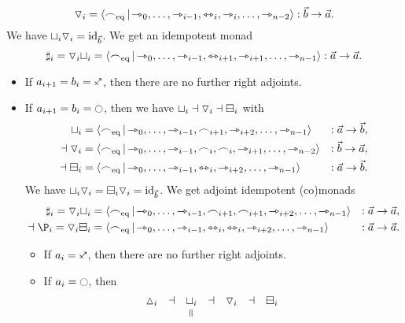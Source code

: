 \documentclass[a4paper]{memoir}
\begin{document}
\begin{example}
\begin{itemize}
		\[
			{\triangledown}_i = \mathopen{}\left\langle {\frown}_{{\mathrm{eq}}} \,\middle|\, {\rightarrowtriangle}_0, \ldots, {\rightarrowtriangle}_{i-1}, {\leftrightarrowtriangle}_{i}, {\rightarrowtriangle}_{i}, \ldots, {\rightarrowtriangle}_{n-2} \right\rangle\mathclose{} : \vec b \to \vec a.
		\]
		We have ${\sqcup}_i {\triangledown}_i = \mathrm{id}_{\vec b}$. We get an idempotent monad
		\[
			\sharp_i = {\triangledown}_i {\sqcup}_i = \mathopen{}\left\langle {\frown}_{{\mathrm{eq}}} \,\middle|\, {\rightarrowtriangle}_0, \ldots, {\rightarrowtriangle}_{i-1}, {\leftrightarrowtriangle}_{i+1}, {\rightarrowtriangle}_{i+1}, \ldots, {\rightarrowtriangle}_{n-1} \right\rangle\mathclose{} : \vec a \to \vec a.
		\]
		\begin{itemize}
			\item If $a_{i+1} = b_i = \ypolar$, then there are no further right adjoints.
			\item If $a_{i+1} = b_i = \npolar$, then we have ${\sqcup}_i \dashv {\triangledown}_i \dashv {\boxminus}_i$ with
			\begin{align*}
				{\sqcup}_i &= \mathopen{}\left\langle {\frown}_{{\mathrm{eq}}} \,\middle|\, {\rightarrowtriangle}_0, \ldots, {\rightarrowtriangle}_{i-1}, {\frown}_{i+1}, {\rightarrowtriangle}_{i+2}, \ldots, {\rightarrowtriangle}_{n-1} \right\rangle\mathclose{} &: \vec a \to \vec b, \\
				\dashv
				{\triangledown}_i &= \mathopen{}\left\langle {\frown}_{{\mathrm{eq}}} \,\middle|\, {\rightarrowtriangle}_0, \ldots, {\rightarrowtriangle}_{i-1}, {\frown}_{i}, {\frown}_{i}, {\rightarrowtriangle}_{i+1}, \ldots, {\rightarrowtriangle}_{n-2} \right\rangle\mathclose{} &: \vec b \to \vec a, \\
				\dashv
				{\boxminus}_i &= \mathopen{}\left\langle {\frown}_{{\mathrm{eq}}} \,\middle|\, {\rightarrowtriangle}_0, \ldots, {\rightarrowtriangle}_{i-1}, \leftrightarrowtriangle_i, {\rightarrowtriangle}_{i+2}, \ldots, {\rightarrowtriangle}_{n-1} \right\rangle\mathclose{} &: \vec a \to \vec b.
			\end{align*}
			We have ${\sqcup}_i {\triangledown}_i = {\boxminus}_i {\triangledown}_i = \mathrm{id}_{\vec b}$. We get adjoint idempotent (co)monads
			\begin{align*}
				\sharp_i = \cohcodisc_i \cohfget_i &= \reshlist{\eqtysym}{\jetsym_0, \ldots, \jetsym_{i-1}, \edgesym_{i+1}, \edgesym_{i+1}, \jetsym_{i+2}, \ldots, \jetsym_{n-1}} &: \vec a \to \vec a, \\
				\dashv
				\coshp_i = \cohcodisc_i \cohcopi_i &= \reshlist{\eqtysym}{\jetsym_0, \ldots, \jetsym_{i-1}, \equijet_{i}, \equijet_{i}, \jetsym_{i+2}, \ldots, \jetsym_{n-1}} &: \vec a \to \vec a.
			\end{align*}
			\begin{itemize}
				\item If $a_i = \ypolar$, then there are no further right adjoints.
				\item If $a_i = \npolar$, then
				\[
					\begin{array}{c c c c c c c c c}
						\cohdisc_i
						&\dashv&
						\cohfget_i
						&\dashv&
						\cohcodisc_i
						&\dashv&
						\cohcopi_i
						&&
						\\
						&&
						\rotatebox{90}{$=$}

\end{array}\]
\end{itemize}
\end{itemize}
\end{itemize}
\end{example}
\end{document}

